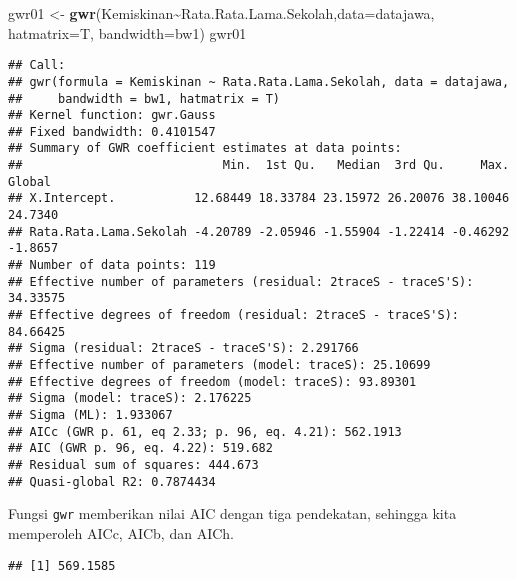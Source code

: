 \documentclass[
]{book}
\newenvironment{Shaded}{\begin{snugshade}}{\end{snugshade}}
\newcommand{\DataTypeTok}[1]{\textcolor[rgb]{0.13,0.29,0.53}{#1}}
\newcommand{\KeywordTok}[1]{\textcolor[rgb]{0.13,0.29,0.53}{\textbf{#1}}}
\newcommand{\NormalTok}[1]{#1}
\newcommand{\OperatorTok}[1]{\textcolor[rgb]{0.81,0.36,0.00}{\textbf{#1}}}
\newcommand{\StringTok}[1]{\textcolor[rgb]{0.31,0.60,0.02}{#1}}
\begin{document}
\begin{Shaded}
\begin{Highlighting}[]
\NormalTok{gwr01 \textless{}{-}}\StringTok{ }\KeywordTok{gwr}\NormalTok{(Kemiskinan}\OperatorTok{\textasciitilde{}}\NormalTok{Rata.Rata.Lama.Sekolah,}\DataTypeTok{data=}\NormalTok{datajawa,}
             \DataTypeTok{hatmatrix=}\NormalTok{T, }\DataTypeTok{bandwidth=}\NormalTok{bw1)}
\NormalTok{gwr01}
\end{Highlighting}
\end{Shaded}

\begin{verbatim}
## Call:
## gwr(formula = Kemiskinan ~ Rata.Rata.Lama.Sekolah, data = datajawa, 
##     bandwidth = bw1, hatmatrix = T)
## Kernel function: gwr.Gauss 
## Fixed bandwidth: 0.4101547 
## Summary of GWR coefficient estimates at data points:
##                            Min.  1st Qu.   Median  3rd Qu.     Max.  Global
## X.Intercept.           12.68449 18.33784 23.15972 26.20076 38.10046 24.7340
## Rata.Rata.Lama.Sekolah -4.20789 -2.05946 -1.55904 -1.22414 -0.46292 -1.8657
## Number of data points: 119 
## Effective number of parameters (residual: 2traceS - traceS'S): 34.33575 
## Effective degrees of freedom (residual: 2traceS - traceS'S): 84.66425 
## Sigma (residual: 2traceS - traceS'S): 2.291766 
## Effective number of parameters (model: traceS): 25.10699 
## Effective degrees of freedom (model: traceS): 93.89301 
## Sigma (model: traceS): 2.176225 
## Sigma (ML): 1.933067 
## AICc (GWR p. 61, eq 2.33; p. 96, eq. 4.21): 562.1913 
## AIC (GWR p. 96, eq. 4.22): 519.682 
## Residual sum of squares: 444.673 
## Quasi-global R2: 0.7874434
\end{verbatim}

Fungsi \texttt{gwr} memberikan nilai AIC dengan tiga pendekatan, sehingga kita memperoleh AICc, AICb, dan AICh.

\begin{Shaded}
\end{Shaded}

\begin{verbatim}
## [1] 569.1585
\end{verbatim}

\begin{Shaded}
\end{Shaded}
\end{document}
